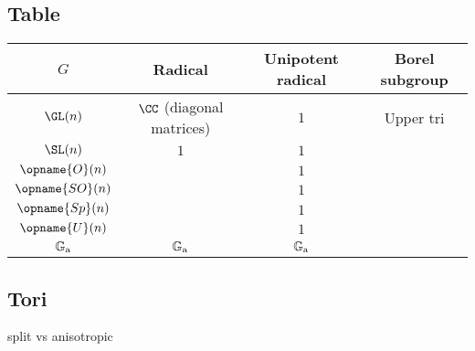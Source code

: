 \subsection{Table}
\begin{center}
  \begin{tabular}[h]{cccc}
    $G$ & Radical & Unipotent radical & Borel subgroup \\ \hline
    $\GL(n)$ & $\CC$ (diagonal matrices) & $1$ & Upper tri \\
    $\SL(n)$ & $1$ & $1$ \\
    $\opname{O}(n)$ & & $1$ \\
    $\opname{SO}(n)$ & & $1$ \\
    $\opname{Sp}(n)$ & & $1$ \\
    $\opname{U}(n)$ & & $1$ \\
    $\mathbb{G}_{\mathrm{a}}$ & $\mathbb{G}_{\mathrm{a}}$ & $\mathbb{G}_{\mathrm{a}}$ & \\
  \end{tabular}
\end{center}

\subsection{Tori}

split vs anisotropic
